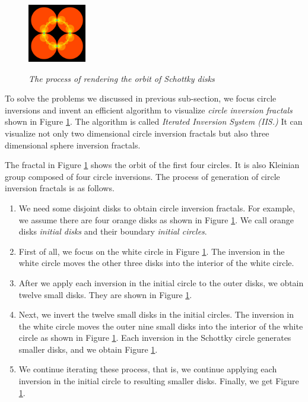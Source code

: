 \begin{figure}[htbp]
\begin{minipage}[t]{0.16\hsize}
  \subcaption{}
  \label{fig:level2}
 \end{minipage}
 \begin{minipage}[t]{0.16\hsize}
  \center
  \includegraphics[width=1in, height=1in, keepaspectratio]{img/preparation/orbit/levelMaxc.pdf}
  \subcaption{}
  \label{fig:levelMax}
 \end{minipage}
 \caption{\textit{The process of rendering the orbit of Schottky disks}}
 \label{fig:schottkyProcess}
\end{figure}

\noindent To solve the problems we discussed in previous sub-section,
we focus circle inversions and invent an efficient algorithm to
visualize \textit{circle inversion fractals} shown in Figure \ref{fig:schottkyProcess}.
The algorithm is called \textit{Iterated Inversion System (IIS.)}
It can visualize not only two dimensional circle inversion fractals but
also three dimensional sphere inversion fractals.

The fractal in Figure \ref{fig:schottkyProcess} shows the orbit of the first
four circles.
It is also Kleinian group composed of four circle inversions.
The process of generation of circle inversion fractals is
as follows.

\begin{enumerate}
 \item We need some disjoint disks to obtain circle inversion fractals.
       For example, we assume there are four orange disks as shown in
       Figure \ref{fig:schottkyProcess}. We call orange disks \textit{initial
       disks} and their boundary \textit{initial circles}.
 \item First of all, we focus on the white circle in Figure
       \ref{fig:schottkyProcess}. The inversion in the white circle moves the
       other three disks into the interior of the white circle.
 \item After we apply each inversion in the initial circle to the outer disks,
       we obtain twelve small disks. They are shown in Figure \ref{fig:schottkyProcess}.
 \item Next, we invert the twelve small disks in the initial circles.
       The inversion in the white circle moves the outer nine small disks
       into the interior of the white circle as shown in Figure \ref{fig:schottkyProcess}.
       Each inversion in the Schottky circle generates smaller disks, and we
       obtain Figure \ref{fig:schottkyProcess}.
 \item We continue iterating these process, that is, we continue
       applying each inversion in the initial circle to resulting
       smaller disks.
       Finally, we get Figure \ref{fig:schottkyProcess}.
\end{enumerate}

